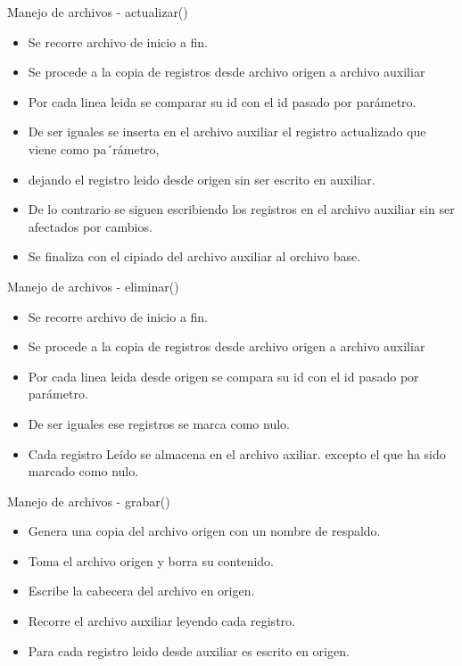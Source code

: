 \begin{frame}{Manejo de archivos - actualizar()}
\begin{itemize}
\item Se recorre archivo de inicio a fin.
\item Se procede a la copia de registros desde archivo origen a archivo auxiliar
 \item Por cada linea leida se comparar su id  con el id pasado por par\'ametro.
 \item De ser iguales se inserta en el archivo auxiliar el registro actualizado que viene como pa´r\'ametro, \item dejando el registro leido desde origen sin ser escrito en auxiliar.
 \item De lo contrario se siguen escribiendo los registros en el archivo auxiliar sin ser afectados por cambios.
\item Se finaliza con el cipiado del archivo auxiliar al orchivo base.
\end{itemize}
\end{frame}

\begin{frame}{Manejo de archivos - eliminar()}
\begin{itemize}
\item Se recorre archivo de inicio a fin.
\item Se procede a la copia de registros desde archivo origen a archivo auxiliar
\item Por cada linea leida desde origen se compara su id  con el id pasado por par\'ametro.
\item De ser iguales ese registros se marca como nulo.
\item Cada registro Le\'ido se almacena en el archivo axiliar. excepto el que ha sido marcado como nulo.
\end{itemize}
\end{frame}

\begin{frame}{Manejo de archivos - grabar()}
\begin{itemize}
\item Genera una copia del archivo origen con un nombre de respaldo.
\item Toma el archivo origen y borra su contenido.
\item Escribe la cabecera del archivo en origen.
\item Recorre el archivo auxiliar leyendo cada registro.
\item Para cada registro leido desde auxiliar es escrito en origen.
	\end{itemize}
\end{frame}
